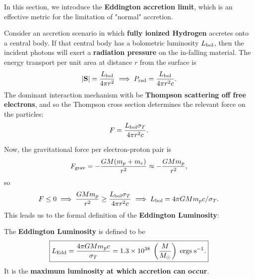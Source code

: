 In this section, we introduce the \textbf{Eddington accretion limit}, which is an effective metric for the limitation of "normal" accretion.
\par
Consider an accretion scenario in which \textbf{fully ionized Hydrogen} accretes onto a central body. If that central body has a bolometric luminosity $L_{\rm bol}$, then the incident photons will exert a \textbf{radiation pressure} on the in-falling material. The energy transport per unit area at distance $r$ from the surface is
\[
|{\bf S}| = \frac{L_{\rm bol}}{4\pi r^2} \implies P_{\rm rad} = \frac{L_{\rm bol}}{4\pi r^2 c}.
\]
The dominant interaction mechanism with be \textbf{Thompson scattering off free electrons}, and so the Thompson cross section determines the relevant force on the particles:
\[
F = \frac{L_{\rm bol}\sigma_T}{4\pi r^2 c}.
\]
\par
Now, the gravitational force per electron-proton pair is
\[
F_{\rm grav} = - \frac{GM(m_p+m_e)}{r^2} \approx - \frac{GMm_p}{r^2},
\]
so
\[
F \le 0 \implies \frac{GMm_p}{r^2} \ge \frac{L_{\rm bol} \sigma_T}{4\pi r^2 c} \implies L_{\rm bol} = 4\pi G M m_p c / \sigma_T.
\]
This leads us to the formal definition of the \textbf{Eddington Luminosity}:
\vspace{0.5cm}
\begin{definition}
The \textbf{Eddington Luminosity} is defined to be
\begin{equation}
    \label{eq:eddington_luminosity}
    \boxed{
    L_{\rm Edd} = \frac{4\pi GMm_p c}{\sigma_T} = 1.3 \times 10^{38} \; \left(\frac{M}{M_\odot}\right) \;\rm{ergs\;s^{-1}}.
    }
\end{equation}
It is the \textbf{maximum luminosity at which accretion can occur}.
\end{definition}


